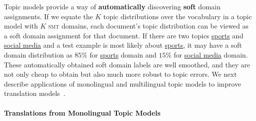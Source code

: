 Topic models provide a way of \textbf{automatically} discovering \textbf{soft} domain assignments. 
If we equate the $K$ topic distributions over the vocabulary in a topic model with $K$ 
\textsc{smt} domains, each document's topic distribution can be viewed as a soft
domain assignment for that document.
If there are two topics \underline{sports} and \underline{social media} and
a test example is most likely about \underline{sports}, it may
have a soft domain distribution as $85\%$ for \underline{sports}
domain and $15\%$ for \underline{social media} domain. These automatically
obtained soft domain labels are well smoothed, and they are not only
cheap to obtain but also much more robust to topic errors. 
We next describe applications of monolingual and multilingual
topic models to improve translation models~\citep{Eidelman-12,hu-14}.





\paragraph{Translations from Monolingual Topic Models}

